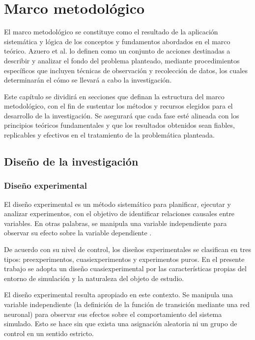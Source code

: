 \chapter{Marco metodológico}

El marco metodológico se constituye como el resultado de la aplicación sistemática y lógica de los conceptos y fundamentos abordados en el marco teórico. Azuero et al. \cite{azuero2019_metodologico} lo definen como un conjunto de acciones destinadas a describir y analizar el fondo del problema planteado, mediante procedimientos específicos que incluyen técnicas de observación y recolección de datos, los cuales determinarán el cómo se llevará a cabo la investigación. 

Este capítulo se dividirá en secciones que definan la estructura del marco metodológico, con el fin de sustentar los métodos y recursos elegidos para el desarrollo de la investigación. Se asegurará que cada fase esté alineada con los principios teóricos fundamentales y que los resultados obtenidos sean fiables, replicables y efectivos en el tratamiento de la problemática planteada.

\section{Diseño de la investigación}

\subsection{Diseño experimental}

El diseño experimental es un método sistemático para planificar, ejecutar y analizar experimentos, con el objetivo de identificar relaciones causales entre variables. En otras palabras, se manipula una variable independiente para observar su efecto sobre la variable dependiente \cite{unam2025_experimental}.

De acuerdo con su nivel de control, los diseños experimentales se clasifican en tres tipos: preexperimentos, cuasiexperimentos y experimentos puros. En el presente trabajo se adopta un diseño cuasiexperimental por las características propias del entorno de simulación y la naturaleza del objeto de estudio.

El diseño experimental resulta apropiado en este contexto. Se manipula una variable independiente (la definición de la función de transición mediante una red neuronal) para observar sus efectos sobre el comportamiento del sistema simulado. Esto se hace sin que exista una asignación aleatoria ni un grupo de control en un sentido estricto. 

